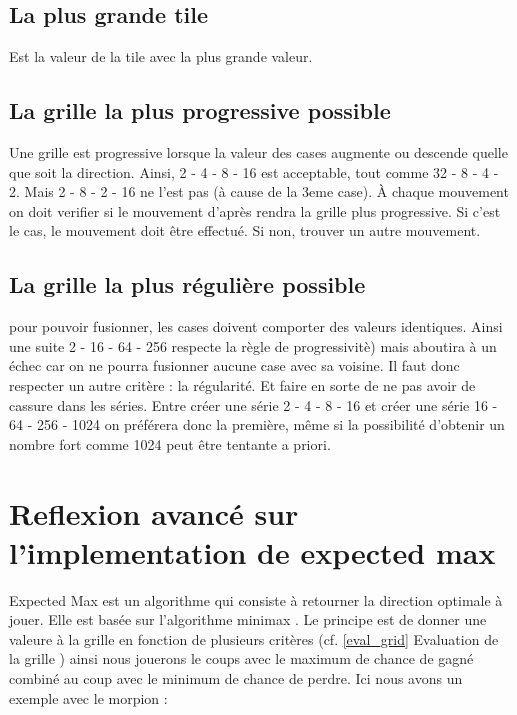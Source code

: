 \documentclass{article}
\begin{document}
	\subsection{La plus grande tile} 
	Est la valeur de la tile avec la plus grande valeur.

	\subsection{La grille la plus progressive possible}
	Une grille est progressive lorsque la valeur des cases augmente ou descende quelle que soit la direction. Ainsi, 2 - 4 - 8 - 16 est acceptable, tout comme 32 - 8 - 4 - 2. Mais 2 - 8 - 2 - 16 ne l'est pas (\`a cause de la 3eme case). \`A chaque mouvement on doit verifier si  le mouvement d'apr\`es rendra la grille plus progressive. Si c'est le cas, le mouvement doit \^etre effectu\'e. Si non, trouver un autre mouvement.

	\subsection{La grille la plus réguli\`ere possible}
	pour pouvoir fusionner, les cases doivent comporter des valeurs identiques. Ainsi une suite 2 - 16 - 64 - 256 respecte la r\`egle de progressivit\`e) mais aboutira à un \'echec car on ne pourra fusionner aucune case avec sa voisine. Il faut donc respecter un autre crit\`ere : la r\'egularit\'e. Et faire en sorte de ne pas avoir de cassure dans les s\'eries. Entre cr\'eer une série 2 - 4 - 8 - 16 et cr\'eer une s\'erie 16 - 64 - 256 - 1024 on pr\'ef\'erera donc la premi\`ere, m\^eme si la possibilit\'e d'obtenir un nombre fort comme 1024 peut \^etre tentante a priori.

\clearpage
\section{Reflexion avanc\'e sur l'implementation de expected max}
\og Expected Max \fg{} est un algorithme qui consiste \`a retourner la direction optimale \`a jouer. Elle est bas\'ee sur l'algorithme \og minimax \fg{}. Le principe est de donner une valeure à la grille en fonction de plusieurs critères (cf. \og \ref{eval_grid} Evaluation de la grille \fg{}) ainsi nous jouerons le coups avec le maximum de chance de gagné combiné au coup avec le minimum de chance de perdre. Ici nous avons un exemple avec le morpion :
\end{document}
